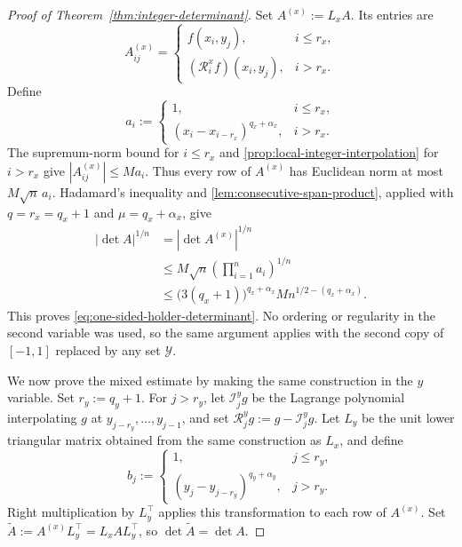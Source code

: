 \documentclass[11pt]{article}
\theoremstyle{definition}
\theoremstyle{remark}
\newcommand{\abs}[1]{\left\lvert #1\right\rvert}
\begin{document}
\begin{proof}[Proof of Theorem~\ref{thm:integer-determinant}]
Set $A^{(x)}:=L_xA$. Its entries are
\[
    A^{(x)}_{ij}
    =
    \begin{cases}
      f(x_i,y_j),
      &i\le r_x,\\[1mm]
      (\mathcal R_i^x f)(x_i,y_j),
      &i>r_x.
    \end{cases}
\]
Define
\[
    a_i:=
    \begin{cases}
      1,&i\le r_x,\\
      (x_i-x_{i-r_x})^{q_x+\alpha_x},&i>r_x.
    \end{cases}
\]
The supremum-norm bound for $i\le r_x$ and
\cref{prop:local-integer-interpolation} for $i>r_x$ give
$\abs{A^{(x)}_{ij}}\le Ma_i$. Thus every row of $A^{(x)}$ has
Euclidean norm at most $M\sqrt n\,a_i$. Hadamard's inequality and
\cref{lem:consecutive-span-product}, applied with
$q=r_x=q_x+1$ and $\mu=q_x+\alpha_x$, give
\[
\begin{aligned}
    \abs{\det A}^{1/n}
    &=
    \abs{\det A^{(x)}}^{1/n}\\
    &\le
    M\sqrt n
    \left(\prod_{i=1}^n a_i\right)^{1/n}\\
    &\le
    \bigl(3(q_x+1)\bigr)^{q_x+\alpha_x}
    M n^{1/2-(q_x+\alpha_x)}.
\end{aligned}
\]
This proves \eqref{eq:one-sided-holder-determinant}.
No ordering or regularity in the second variable was used, so the same
argument applies with the second copy of $[-1, 1]$ replaced by any set
$\mathcal Y$.

We now prove the mixed estimate by making the same construction in the
$y$ variable. Set $r_y:=q_y+1$. For $j>r_y$, let
$\mathcal I_j^yg$ be the Lagrange polynomial interpolating $g$ at
$y_{j-r_y},\ldots,y_{j-1}$, and set $
    \mathcal R_j^yg:=g-\mathcal I_j^yg.
$
Let $L_y$ be the unit lower triangular matrix obtained from the same
construction as $L_x$, and define
\[
    b_j:=
    \begin{cases}
      1,&j\le r_y,\\
      (y_j-y_{j-r_y})^{q_y+\alpha_y},&j>r_y.
    \end{cases}
\]
Right multiplication by $L_y^\top$ applies this transformation to each
row of $A^{(x)}$. Set
$\widetilde A:=A^{(x)}L_y^\top=L_xAL_y^\top$, so
$\det\widetilde A=\det A$.


\end{proof}
\end{document}
